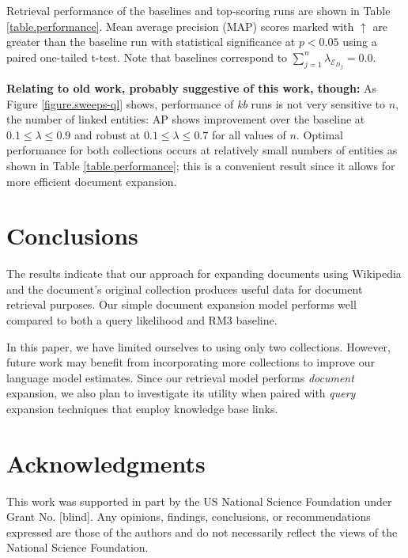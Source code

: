 \documentclass{report}
\begin{document}
Retrieval performance of the baselines and top-scoring runs are shown in Table \ref{table.performance}. Mean average precision (MAP) scores marked with $\uparrow$ are greater than the baseline run with statistical significance at $p < 0.05$ using a paired one-tailed t-test. Note that baselines correspond to $\sum_{j=1}^n \lambda_{{\mathcal{E}_D}_j} = 0.0$. 

\textbf{Relating to old work, probably suggestive of this work, though:} As Figure \ref{figure.sweeps-ql} shows, performance of \textit{kb} runs is not very sensitive to $n$, the number of linked entities: AP shows improvement over the baseline at $0.1 \leq \lambda \leq 0.9$ and robust at $0.1 \leq \lambda \leq 0.7$ for all values of $n$. Optimal performance for both collections occurs at relatively small numbers of entities as shown in Table \ref{table.performance}; this is a convenient result since it allows for more efficient document expansion.


\section{Conclusions}\label{section.conclusions}

The results indicate that our approach for expanding documents using Wikipedia and the document's original collection produces useful data for document retrieval purposes. Our simple document expansion model performs well compared to both a query likelihood and RM3 baseline.

In this paper, we have limited ourselves to using only two collections. However, future work may benefit from incorporating more collections to improve our language model estimates. Since our retrieval model performs \textit{document} expansion, we also plan to investigate its utility when paired with \textit{query} expansion techniques that employ knowledge base links.

\section{Acknowledgments}\label{section.acknowledgments}
This work was supported in part by the US National Science Foundation under Grant No. [blind]. Any opinions, findings, conclusions, or recommendations expressed are those of the authors and do not necessarily reflect the views of the National Science Foundation.



  
\end{document}
